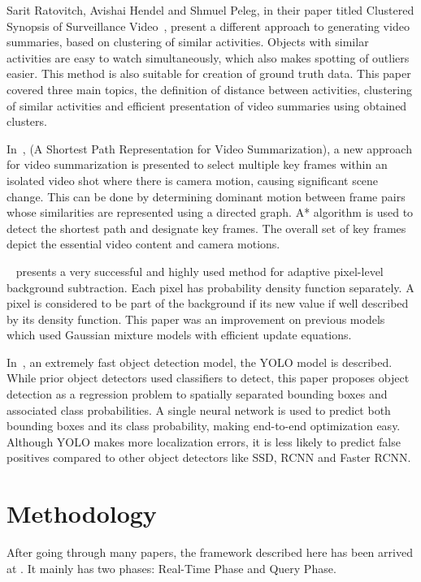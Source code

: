 \documentclass[conference]{IEEEtran}
\begin{document}
Sarit Ratovitch, Avishai Hendel and Shmuel Peleg, in their paper titled
Clustered Synopsis of Surveillance Video~\cite{pritch2009clustered}, present a
different approach to generating video summaries, based on clustering of
similar activities. Objects with similar activities are easy to watch
simultaneously, which also makes spotting of outliers easier. This method is
also suitable for creation of ground truth data. This paper covered three main
topics, the definition of distance between activities, clustering of similar
activities and efficient presentation of video summaries using obtained
clusters.

In~\cite{porter2003shortest}, (A Shortest Path Representation for Video
Summarization), a new approach for video summarization is presented to select
multiple key frames within an isolated video shot where there is camera motion,
causing significant scene change. This can be done by determining dominant
motion between frame pairs whose similarities are represented using a directed
graph. A* algorithm is used to detect the shortest path and designate key
frames. The overall set of key frames depict the essential video content and
camera motions.

~\cite{zivkovic2004improved} presents a very successful and highly used method
for adaptive pixel-level background subtraction. Each pixel has probability
density function separately. A pixel is considered to be part of the background
if its new value if well described by its density function. This paper was an
improvement on previous models which used Gaussian mixture models with
efficient update equations.

In~\cite{redmon2016you}, an extremely fast object detection model, the
YOLO model is described. While prior object detectors used classifiers to
detect, this paper proposes object detection as a regression problem to
spatially separated bounding boxes and associated class probabilities. A single
neural network is used to predict both bounding boxes and its class probability,
making end-to-end optimization easy. Although YOLO makes more localization
errors, it is less likely to predict false positives compared to other object
detectors like SSD, RCNN and Faster RCNN.

\section{Methodology}
After going through many papers, the framework described here has been arrived at . It mainly has two phases: Real-Time Phase and Query Phase.
\end{document}
